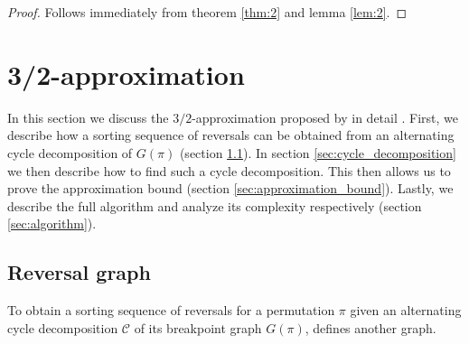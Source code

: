 \documentclass[11pt,DIV=11]{scrartcl}
\theoremstyle{definition}
\theoremstyle{remark}
\begin{document}
\begin{proof}
Follows immediately from theorem \ref{thm:2} and lemma \ref{lem:2}.
\end{proof}

\section{3/2-approximation}
\label{sec:32_approximation}

In this section we discuss the $3/2$-approximation proposed by \citeauthor*{Christie1998} in detail \cite{Christie1998}. First, we describe how a sorting sequence of reversals can be obtained from an alternating cycle decomposition of $G(\pi)$ (section \ref{sec:reversal_graph}). In section \ref{sec:cycle_decomposition} we then describe how to find such a cycle decomposition. This then allows us to prove the approximation bound (section \ref{sec:approximation_bound}). Lastly, we describe the full algorithm and analyze its complexity respectively (section \ref{sec:algorithm}).

\subsection{Reversal graph}
\label{sec:reversal_graph}

To obtain a sorting sequence of reversals for a permutation $\pi$ given an alternating cycle decomposition $\mathcal{C}$ of its breakpoint graph $G(\pi)$, \citeauthor*{Christie1998} defines another graph.
\end{document}
